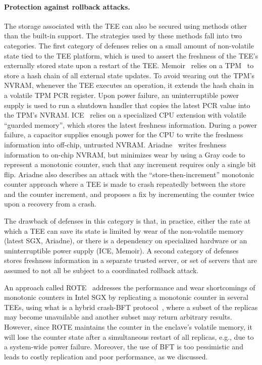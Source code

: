 \paragraph{Protection against rollback attacks.}
The storage associated with the TEE can also be secured using
methods other than the built-in support. The strategies used by
these methods fall into two categories. The first category of
defenses relies on a small amount of non-volatile state tied to
the TEE platform, which is used to assert the freshness of the
TEE's externally stored state upon a restart of the TEE.
Memoir~\cite{memoir} relies on a TPM~\cite{tpm} to store a hash
chain of all external state updates.  To avoid wearing out the
TPM's NVRAM, whenever the TEE executes an operation, it extends
the hash chain in a volatile TPM PCR register. Upon power
failure, an uninterruptible power supply is used to run a
shutdown handler that copies the latest PCR value into the TPM's
NVRAM.  ICE~\cite{ice} relies on a specialized CPU extension with
volatile ``guarded memory'', which stores the latest freshness
information. During a power failure, a capacitor supplies enough
power for the CPU to write the freshness information into
off-chip, untrusted NVRAM. Ariadne~\cite{ariadne} writes
freshness information to on-chip NVRAM, but minimizes wear by
using a Gray code to represent a monotonic counter, such that any
increment requires only a single bit flip. Ariadne also describes
an attack with the ``store-then-increment'' monotonic counter
approach where a TEE is made to crash repeatedly between the
store and the counter increment, and proposes a fix by
incrementing the counter twice upon a recovery from a crash.

The drawback of defenses in this category is that, in practice,
either the rate at which a TEE can save its state is limited by
wear of the non-volatile memory (latest SGX, Ariadne), or there
is a dependency on specialized hardware or an uninterruptible
power supply (ICE, Memoir). A second category of defenses stores freshness information in a
separate trusted server, or set of servers that are assumed to
not all be subject to a coordinated rollback attack.

An approach called ROTE~\cite{rote} addresses the performance and
wear shortcomings of monotonic counters in Intel SGX by
replicating a monotonic counter in several TEEs, using what is a
hybrid crash-BFT protocol~\cite{MeyerPradhan91, upright}, where a
subset of the replicas may become unavailable and another subset
may return arbitrary results. However, since ROTE maintains the
counter in the enclave's volatile memory, it will lose the
counter state after a simultaneous restart of all replicas, e.g.,
due to a system-wide power failure. Moreover, the use of BFT is
too pessimistic and leads to costly replication and poor
performance, as we discussed.

